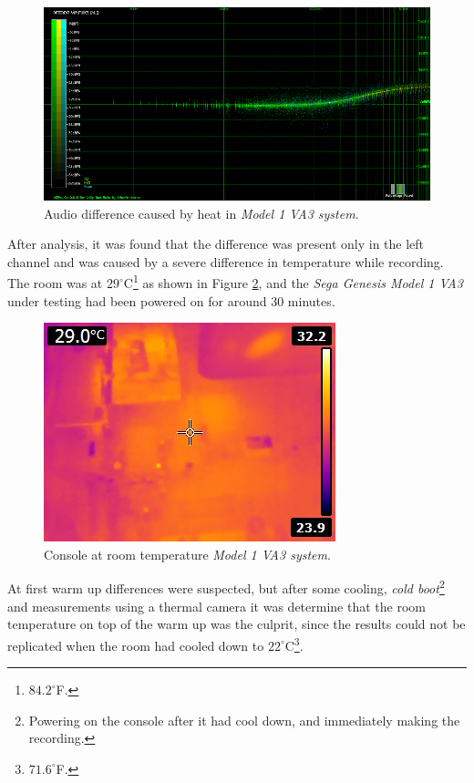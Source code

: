 \documentclass[10pt,a4paper]{report}
\begin{document}
\begin{appendices}
\begin{figure}[H]
	\centering
	\includegraphics[width=1.0\linewidth]{images/heat/0-plotheat.png}
	\caption[Heat Difference]{Audio difference caused by heat in \textit{Model 1 VA3 system}.}
	\label{fig:heatdiff}
\end{figure}

After analysis, it was found that the difference was present only in the left channel and was caused by a severe difference in temperature while recording. The room was at $29^\circ$C\footnote{$84.2^\circ$F.} as shown in Figure \ref{fig:heatroomtemp}, and the \textit{Sega Genesis Model 1 VA3} under testing had been powered on for around 30 minutes.

\begin{figure}[H]
	\centering
	\includegraphics[width=0.4\linewidth]{images/heat/1-roomtemp.jpg}
	\caption[Room temperature]{Console at room temperature \textit{Model 1 VA3 system}.}
	\label{fig:heatroomtemp}
\end{figure}

At first warm up differences were suspected, but after some cooling, \textit{cold boot}\footnote{Powering on the console after it had cool down, and immediately making the recording.} and measurements using a thermal camera it was determine that the room temperature on top of the warm up was the culprit, since the results could not be replicated when the room had cooled down to $22^\circ$C\footnote{$71.6^\circ$F.}. 


\end{appendices}
\end{document}
